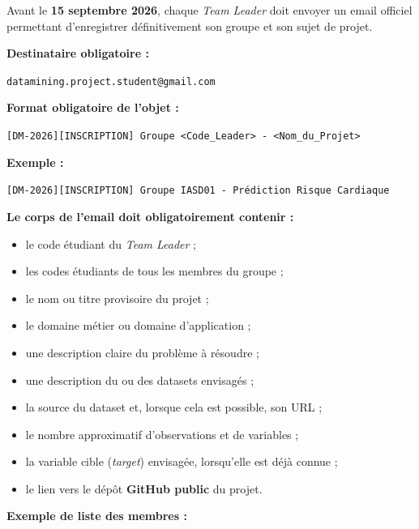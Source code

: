 \documentclass[11pt,a4paper]{article}
\begin{document}
\begin{tcolorbox}[
    colback=sintefblue!8,
    colframe=sintefblue,
    title=\textbf{DIRECTIVES OFFICIELLES DE COMMUNICATION, DE SUIVI ET DE RENDU},
    arc=2mm,
    boxrule=0.8pt,
    breakable
]
\begin{enumerate}[leftmargin=*]
    Avant le \textbf{15 septembre 2026}, chaque \textit{Team Leader} doit envoyer
    un email officiel permettant d'enregistrer définitivement son groupe et son
    sujet de projet.

    \vspace{1mm}

    \textbf{Destinataire obligatoire :}

    \begin{center}
        \texttt{datamining.project.student@gmail.com}
    \end{center}

    \textbf{Format obligatoire de l'objet :}

    \begin{center}
        \texttt{[DM-2026][INSCRIPTION] Groupe <Code\_Leader> - <Nom\_du\_Projet>}
    \end{center}

    \textbf{Exemple :}

    \begin{center}
        \texttt{[DM-2026][INSCRIPTION] Groupe IASD01 - Prédiction Risque Cardiaque}
    \end{center}

    \textbf{Le corps de l'email doit obligatoirement contenir :}

    \begin{itemize}
        \item le code étudiant du \textit{Team Leader} ;
        \item les codes étudiants de tous les membres du groupe ;
        \item le nom ou titre provisoire du projet ;
        \item le domaine métier ou domaine d'application ;
        \item une description claire du problème à résoudre ;
        \item une description du ou des datasets envisagés ;
        \item la source du dataset et, lorsque cela est possible, son URL ;
        \item le nombre approximatif d'observations et de variables ;
        \item la variable cible (\textit{target}) envisagée, lorsqu'elle est déjà connue ;
        \item le lien vers le dépôt \textbf{GitHub public} du projet.
    \end{itemize}

    \textbf{Exemple de liste des membres :}


\end{enumerate}
\end{tcolorbox}
\end{document}

